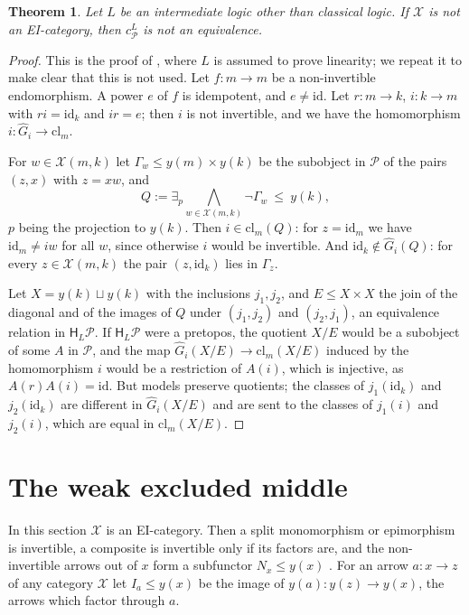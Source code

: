 \documentclass[11pt]{amsart}
\newtheorem{thm}{Theorem}[section]
\theoremstyle{definition}
\newcommand{\HH}{\mathsf H}
\newcommand{\cX}{\mathcal X}
\newcommand{\cP}{\mathcal P}
\newcommand{\id}{\mathrm{id}}
\begin{document}
\begin{thm}\label{thm:nonEI}
Let $L$ be an intermediate logic other than classical logic. If $\cX$
is not an EI-category, then $c^L_\cP$ is not an equivalence.
\end{thm}
\begin{proof}
This is the proof of \cite[Thm.~7.1]{Strings}, where $L$ is assumed to
prove linearity; we repeat it to make clear that this is not used. Let
$f\colon m\to m$ be a non-invertible endomorphism. A power $e$ of $f$
is idempotent, and $e\ne\id$. Let $r\colon m\to k$, $i\colon k\to m$
with $ri=\id_k$ and $ir=e$; then $i$ is not invertible, and we have the
homomorphism $i\colon\hat G_i\to\mathrm{cl}_m$.

For $w\in\cX(m,k)$ let $\Gamma_w\le y(m)\times y(k)$ be the subobject in
$\cP$ of the pairs $(z,x)$ with $z=xw$, and
\[
Q:=\exists_{p}\bigwedge_{w\in\cX(m,k)}\neg\Gamma_w\ \le\ y(k),
\]
$p$ being the projection to $y(k)$. Then $i\in\mathrm{cl}_m(Q)$: for
$z=\id_m$ we have $\id_m\ne iw$ for all $w$, since otherwise $i$ would
be invertible. And $\id_k\notin\hat G_i(Q)$: for every $z\in\cX(m,k)$
the pair $(z,\id_k)$ lies in $\Gamma_z$.

Let $X=y(k)\sqcup y(k)$ with the inclusions $j_1,j_2$, and $E\le
X\times X$ the join of the diagonal and of the images of $Q$ under
$(j_1,j_2)$ and $(j_2,j_1)$, an equivalence relation in $\HH_L\cP$. If
$\HH_L\cP$ were a pretopos, the quotient $X/E$ would be a subobject of
some $A$ in $\cP$, and the map $\hat G_i(X/E)\to\mathrm{cl}_m(X/E)$
induced by the homomorphism $i$ would be a restriction of $A(i)$,
which is injective, as $A(r)A(i)=\id$. But models preserve quotients;
the classes of $j_1(\id_k)$ and $j_2(\id_k)$ are different in $\hat
G_i(X/E)$ and are sent to the classes of $j_1(i)$ and $j_2(i)$, which
are equal in $\mathrm{cl}_m(X/E)$.
\end{proof}

\section{The weak excluded middle}

In this section $\cX$ is an EI-category. Then a split monomorphism or
epimorphism is invertible, a composite is invertible only if its
factors are, and the non-invertible arrows out of $x$ form a subfunctor
$N_x\le y(x)$ \cite[\S4]{Strings}. For an arrow $a\colon x\to z$ of any category $\cX$ let
$I_a\le y(x)$ be the image of $y(a)\colon y(z)\to y(x)$, the arrows
which factor through $a$.
\end{document}
